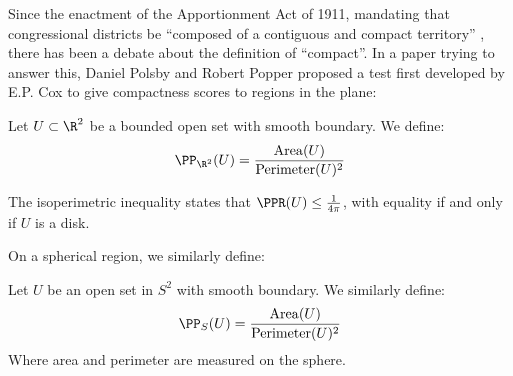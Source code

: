 



Since the enactment of the Apportionment Act of 1911, 
mandating that congressional districts be \enquote{composed of a contiguous and compact territory} \cite{App1911}, there has been a debate about the definition of \enquote{compact}. In a paper\cite{PP_Paper} trying to answer this, Daniel Polsby and Robert Popper proposed a test first developed by E.P. Cox \cite{EPCox} to give 
compactness scores to regions in the plane:
\begin{Definition} \label{PP_Plane}
  Let $U\subset \R^2$ be a bounded open set with smooth
  boundary. We define:
  \begin{align*}
    \PP_{\R^2}(U) =\frac{\mathrm{Area}(U)}{\mathrm{Perimeter}(U)^2}
  \end{align*}
\end{Definition}
  The isoperimetric inequality states that $\PPR(U)\le \frac{1}{4\pi}$, with equality if and only if $U$ is a disk.\cite{SteinShak}

On a spherical region, we similarly define:
\begin{Definition}
  Let $U$ be an open set in $S^2$ with smooth boundary. 
  We similarly define:
  \begin{align*}
    \PP_S(U) = \frac{\mathrm{Area}(U)}{\mathrm{Perimeter}(U)^2}
  \end{align*}
  Where area and perimeter are measured on the sphere.
\end{Definition}

